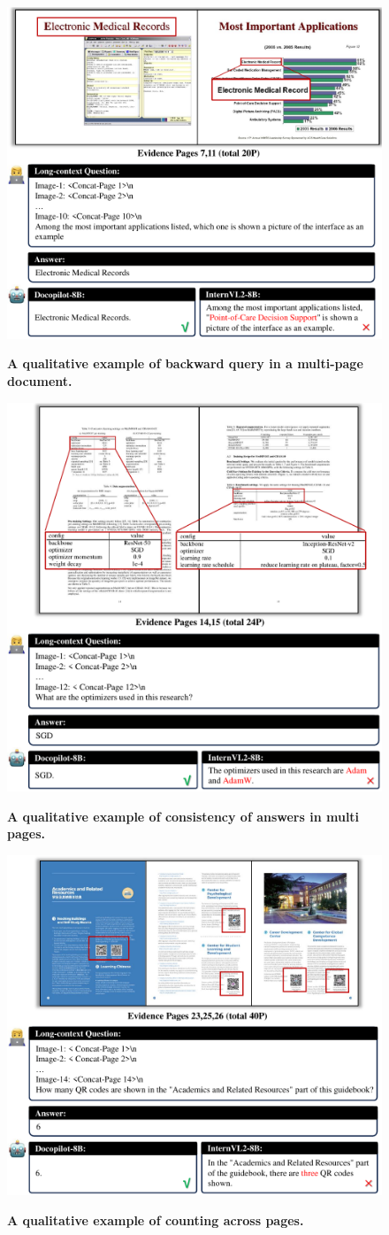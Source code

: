 \begin{figure}[]
    \centering
    {\includegraphics[width=0.65\linewidth]{figure/sample2.pdf}}
    \caption{\textbf{A qualitative example of backward query in a multi-page document.}}
    \label{fig:good_sample2}
\end{figure}

\begin{figure}[]
    \centering
    {\includegraphics[width=0.6\linewidth]{figure/sample3.pdf}}
    \caption{\textbf{A qualitative example of consistency of answers in multi pages.}}
    \label{fig:good_sample3}
\end{figure}

\begin{figure}[]
    \centering
    {\includegraphics[width=0.6\linewidth]{figure/sample4.pdf}}
    \caption{\textbf{A qualitative example of counting across pages.}}
    \label{fig:good_sample4}
\end{figure}

